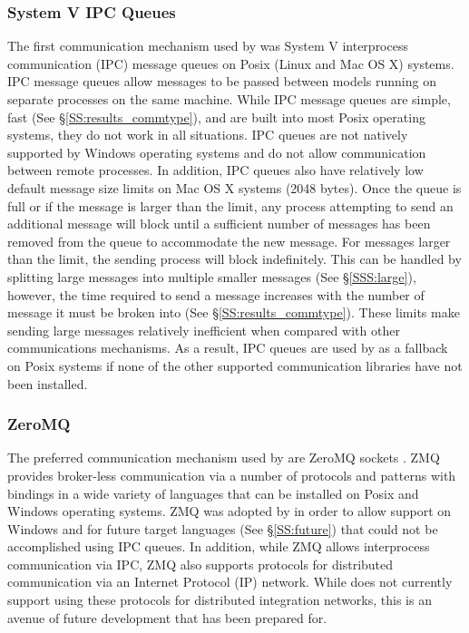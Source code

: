 \documentclass[journal]{IEEEtran}
\newcommand{\todo}[1]{{\color{red}{#1}}}
\newcommand{\pkg}{{\tt \todo{cis\_interface}}{}}
\begin{document}
\subsubsection{System V IPC Queues}\label{SSS:ipc}
%
The first communication mechanism used by {\pkg} was System V interprocess communication (IPC) message queues \citep{Rusling1999} on Posix (Linux and Mac OS X) systems. IPC message queues allow messages to be passed between models running on separate processes on the same machine. While IPC message queues are simple, fast (See \S\ref{SS:results_commtype}), and are built into most Posix operating systems, they do not work in all situations. IPC queues are not natively supported by Windows operating systems and do not allow communication between remote processes. In addition, IPC queues also have relatively low default message size limits on Mac OS X systems (2048 bytes). Once the queue is full or if the message is larger than the limit, any process attempting to send an additional message will block until a sufficient number of messages has been removed from the queue to accommodate the new message. For messages larger than the limit, the sending process will block indefinitely. This can be handled by splitting large messages into multiple smaller messages (See \S\ref{SSS:large}), however, the time required to send a message increases with the number of message it must be broken into (See \S\ref{SS:results_commtype}). These limits make sending large messages relatively inefficient when compared with other communications mechanisms. As a result, IPC queues are used by {\pkg} as a fallback on Posix systems if none of the other supported communication libraries have not been installed.

\subsubsection{ZeroMQ}\label{SSS:zmq}
%
The preferred communication mechanism used by {\pkg} are ZeroMQ sockets \citep[ZMQ][]{Akgul2013}. ZMQ provides broker-less communication via a number of protocols and patterns with bindings in a wide variety of languages that can be installed on Posix and Windows operating systems. ZMQ was adopted by {\pkg} in order to allow support on Windows and for future target languages (See \S\ref{SS:future}) that could not be accomplished using IPC queues. In addition, while ZMQ allows interprocess communication via IPC, ZMQ also supports protocols for distributed communication via an Internet Protocol (IP) network. While {\pkg} does not currently support using these protocols for distributed integration networks, this is an avenue of future development that has been prepared for.
\end{document}
